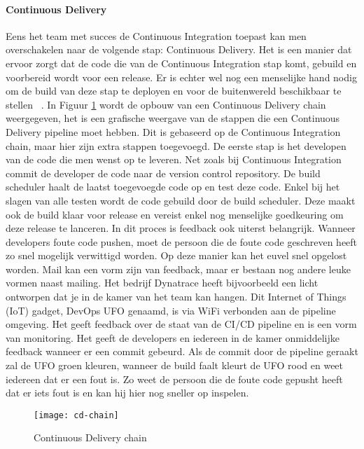     \paragraph{Continuous Delivery}
    Eens het team met succes de Continuous Integration toepast kan men overschakelen naar de volgende stap: Continuous Delivery.
    Het is een manier dat ervoor zorgt dat de code die van de Continuous Integration stap komt, gebuild en voorbereid wordt voor een release.
    Er is echter wel nog een menselijke hand nodig om de build van deze stap te deployen en voor de buitenwereld beschikbaar te stellen ~\autocite{Fowler2013}.
    \newline{}In Figuur \ref{img-cd-chain} wordt de opbouw van een Continuous Delivery chain weergegeven, het is een grafische weergave van de stappen die een Continuous Delivery pipeline moet hebben. Dit is gebaseerd op de Continuous Integration chain, maar hier zijn extra stappen toegevoegd.
    De eerste stap is het developen van de code die men wenst op te leveren. Net zoals bij Continuous Integration commit de developer de code naar de version control repository. De build scheduler haalt de laatst toegevoegde code op en test deze code. Enkel bij het slagen van alle testen wordt de code gebuild door de build scheduler. Deze maakt ook de build klaar voor release en vereist enkel nog menselijke goedkeuring om deze release te lanceren.
    \newline{}In dit proces is feedback ook uiterst belangrijk. Wanneer developers foute code pushen, moet de persoon die de foute code geschreven heeft zo snel mogelijk verwittigd worden. Op deze manier kan het euvel snel opgelost worden.
    Mail kan een vorm zijn van feedback, maar er bestaan nog andere leuke vormen naast mailing. Het bedrijf Dynatrace heeft bijvoorbeeld een licht ontworpen dat je in de kamer van het team kan hangen. Dit Internet of Things (IoT) gadget, DevOps UFO genaamd, is via WiFi verbonden aan de pipeline omgeving. Het geeft feedback over de staat van de CI/CD pipeline en is een vorm van monitoring. Het geeft de developers en iedereen in de kamer onmiddelijke feedback wanneer er een commit gebeurd. Als de commit door de pipeline geraakt zal de UFO groen kleuren, wanneer de build faalt kleurt de UFO rood en weet iedereen dat er een fout is. Zo weet de persoon die de foute code gepusht heeft dat er iets fout is en kan hij hier nog sneller op inspelen. 
    \begin{figure}	
        \texttt{[image: cd-chain]}
        \caption{Continuous Delivery chain ~\autocite{Riti2018}} \label{img-cd-chain}
    \end{figure}
    
